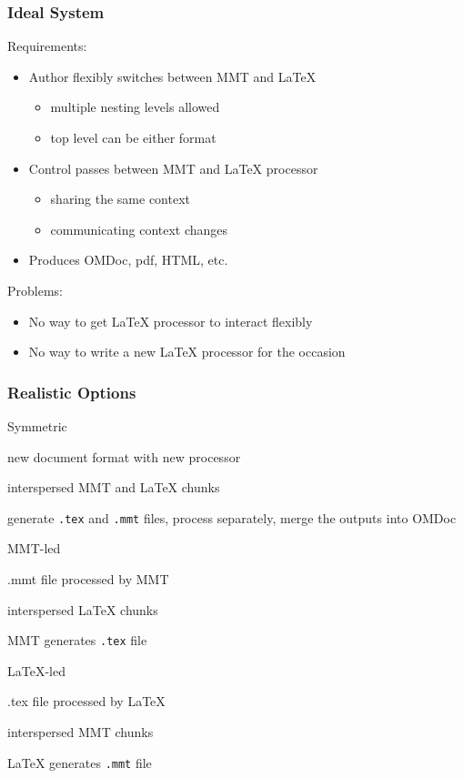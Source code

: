 \begin{frame}\frametitle{Ideal System}
Requirements:
\begin{itemize}
\item Author flexibly switches between MMT and LaTeX
 \begin{itemize}
 \item multiple nesting levels allowed
 \item top level can be either format
 \end{itemize}
\item Control passes between MMT and LaTeX processor
 \begin{itemize}
 \item sharing the same context
 \item communicating context changes
 \end{itemize}
\item Produces OMDoc, pdf, HTML, etc.
\end{itemize}

Problems:
\begin{itemize}
\item No way to get LaTeX processor to interact flexibly
\item No way to write a new LaTeX processor for the occasion
\end{itemize}
\end{frame}

\begin{frame}\frametitle{Realistic Options}
\begin{blockitems}{Symmetric}
\item new document format with new processor
\item interspersed MMT and LaTeX chunks
\item generate \texttt{.tex} and \texttt{.mmt} files, process separately, merge the outputs into OMDoc
\end{blockitems}

\begin{blockitems}{MMT-led}
\item .mmt file processed by MMT
\item interspersed LaTeX chunks
\item MMT generates \texttt{.tex} file
\end{blockitems}

\begin{blockitems}{LaTeX-led}
\item .tex file processed by LaTeX
\item interspersed MMT chunks
\item LaTeX generates \texttt{.mmt} file
\end{blockitems}
\end{frame}

